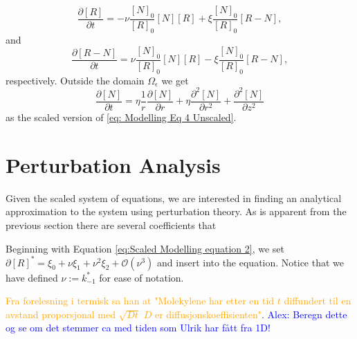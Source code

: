 \documentclass{article}
\begin{document}
\begin{equation}
    \frac{\partial [R]}{\partial t} = - \nu \frac{[N]_0}{[R]_0} [N][R] + \xi \frac{[N]_0}{[R]_0} [R-N],
    \label{skalert_sylinder3}
\end{equation}
and 
\begin{equation}
    \frac{\partial [R-N]}{\partial t} = \nu \frac{[N]_0}{[R]_0} [N][R] - \xi \frac{[N]_0}{[R]_0} [R-N],
    \label{skalert_sylinder4}
\end{equation}
respectively. Outside the domain $\Omega_\epsilon$ we get
\begin{equation}
    \frac{\partial [N]}{\partial t} = 
    \eta \frac{1}{r} \frac{\partial [N]}{\partial r} +\eta  \frac{\partial^2 [N]}{\partial r^2}  +  \frac{\partial^2 [N]}{\partial z^2}
    \label{skalert_sylinder5}
\end{equation}
as the scaled version of \eqref{eq: Modelling Eq 4 Unscaled}.

\section{Perturbation Analysis}
Given the scaled system of equations, we are interested in finding an analytical approximation to the system using perturbation theory. As is apparent from the previous section there are several coefficients that

Beginning with Equation \eqref{eq:Scaled Modelling equation 2}, we set $\partial [R]^* = \xi_0 + \nu \xi_1 + \nu^2 \xi_2 + \mathcal{O}(\nu^3)$ and insert into the equation. Notice that we have defined $\nu := k_{-1}^*$ for ease of notation.  

\textcolor{orange}{Fra forelesning i termisk sa han at "Molekylene har etter en tid $t$ diffundert til en avstand proporsjonal med $\sqrt{D t}$ $D$ er diffusjonskoeffisienten"}. \textcolor{blue}{Alex: Beregn dette og se om det stemmer ca med tiden som Ulrik har fått fra 1D!}
\end{document}
